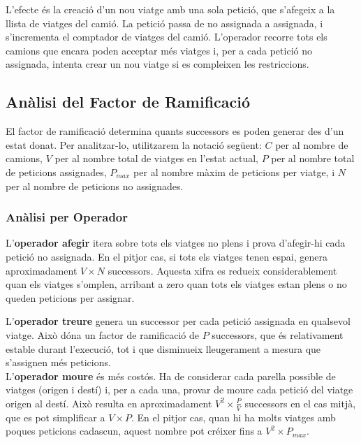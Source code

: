 L'efecte és la creació d'un nou viatge amb una sola petició, que s'afegeix a la llista de viatges del camió. La petició passa de no assignada a assignada, i s'incrementa el comptador de viatges del camió. L'operador recorre tots els camions que encara poden acceptar més viatges i, per a cada petició no assignada, intenta crear un nou viatge si es compleixen les restriccions.

\subsection{Anàlisi del Factor de Ramificació}

El factor de ramificació determina quants successors es poden generar des d'un estat donat. Per analitzar-lo, utilitzarem la notació següent: $C$ per al nombre de camions, $V$ per al nombre total de viatges en l'estat actual, $P$ per al nombre total de peticions assignades, $P_{max}$ per al nombre màxim de peticions per viatge, i $N$ per al nombre de peticions no assignades.

\subsubsection{Anàlisi per Operador}

L'\textbf{operador afegir} itera sobre tots els viatges no plens i prova d'afegir-hi cada petició no assignada. En el pitjor cas, si tots els viatges tenen espai, genera aproximadament $V \times N$ successors. Aquesta xifra es redueix considerablement quan els viatges s'omplen, arribant a zero quan tots els viatges estan plens o no queden peticions per assignar.

\vspace{0.5em}  
L'\textbf{operador treure} genera un successor per cada petició assignada en qualsevol viatge. Això dóna un factor de ramificació de $P$ successors, que és relativament estable durant l'execució, tot i que disminueix lleugerament a mesura que s'assignen més peticions.\\[0.5em] 

L'\textbf{operador moure} és més costós. Ha de considerar cada parella possible de viatges (origen i destí) i, per a cada una, provar de moure cada petició del viatge origen al destí. Això resulta en aproximadament $V^2 \times \frac{P}{V}$ successors en el cas mitjà, que es pot simplificar a $V \times P$. En el pitjor cas, quan hi ha molts viatges amb poques peticions cadascun, aquest nombre pot créixer fins a $V^2 \times P_{max}$.

